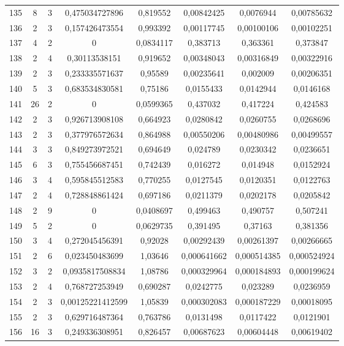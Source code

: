 \begin{longtable}{|c|c|c|c|c|c|c|c|}
135 & 8 & 3 & 0,475034727896 & 0,819552 & 0,00842425 & 0,0076944 & 0,00785632  \\
136 & 2 & 3 & 0,157426473554 & 0,993392 & 0,00117745 & 0,00100106 & 0,00102251  \\
137 & 4 & 2 & 0 & 0,0834117 & 0,383713 & 0,363361 & 0,373847  \\
138 & 2 & 4 & 0,30113538151 & 0,919652 & 0,00348043 & 0,00316849 & 0,00322916  \\
139 & 2 & 3 & 0,233335571637 & 0,95589 & 0,00235641 & 0,002009 & 0,00206351  \\
140 & 5 & 3 & 0,683534830581 & 0,75186 & 0,0155433 & 0,0142944 & 0,0146168  \\
141 & 26 & 2 & 0 & 0,0599365 & 0,437032 & 0,417224 & 0,424583  \\
142 & 2 & 3 & 0,926713908108 & 0,664923 & 0,0280842 & 0,0260755 & 0,0268696  \\
143 & 2 & 3 & 0,377976572634 & 0,864988 & 0,00550206 & 0,00480986 & 0,00499557  \\
144 & 3 & 3 & 0,849273972521 & 0,694649 & 0,024789 & 0,0230342 & 0,0236651  \\
145 & 6 & 3 & 0,755456687451 & 0,742439 & 0,016272 & 0,014948 & 0,0152924  \\
146 & 3 & 4 & 0,595845512583 & 0,770255 & 0,0127545 & 0,0120351 & 0,0122763  \\
147 & 2 & 4 & 0,728848861424 & 0,697186 & 0,0211379 & 0,0202178 & 0,0205842  \\
148 & 2 & 9 & 0 & 0,0408697 & 0,499463 & 0,490757 & 0,507241  \\
149 & 5 & 2 & 0 & 0,0629735 & 0,391495 & 0,37163 & 0,381356  \\
150 & 3 & 4 & 0,272045456391 & 0,92028 & 0,00292439 & 0,00261397 & 0,00266665  \\
151 & 2 & 6 & 0,023450483699 & 1,03646 & 0,000641662 & 0,000514385 & 0,000524924  \\
152 & 3 & 2 & 0,0935817508834 & 1,08786 & 0,000329964 & 0,000184893 & 0,000199624  \\
153 & 2 & 4 & 0,768727253949 & 0,690287 & 0,0242775 & 0,023289 & 0,0236959  \\
154 & 2 & 3 & 0,00125221412599 & 1,05839 & 0,000302083 & 0,000187229 & 0,00018095  \\
155 & 2 & 3 & 0,629716487364 & 0,763786 & 0,0131498 & 0,0117422 & 0,0121901  \\
156 & 16 & 3 & 0,249336308951 & 0,826457 & 0,00687623 & 0,00604448 & 0,00619402  \\

\end{longtable}
